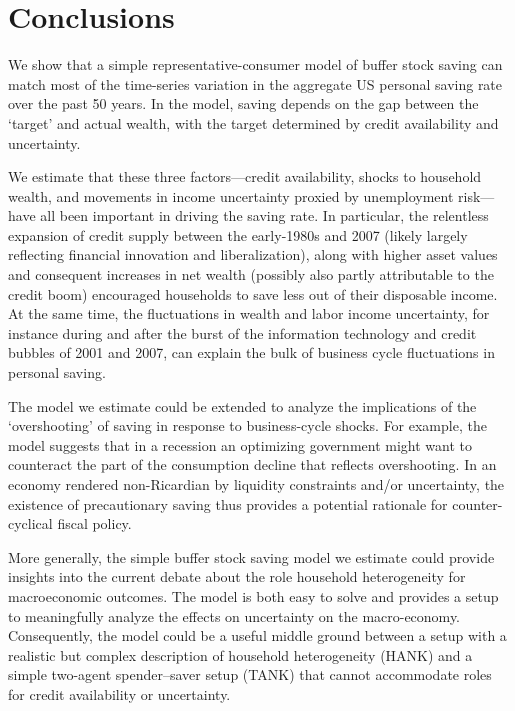 \documentclass[titlepage]{\econtex}
\begin{document}
\section{Conclusions} \label{conclusions}

We show that a simple representative-consumer model of buffer stock saving can match most of the time-series variation in the aggregate US personal saving rate over the past 50 years. In the model, saving depends on the gap between the `target' and actual wealth, with the target determined by credit availability and uncertainty.

We estimate that these three factors---credit availability, shocks to household wealth, and movements in income uncertainty proxied by unemployment risk---have all been important in driving the saving rate. In particular, the relentless expansion of credit supply between the early-1980s and 2007 (likely largely reflecting financial innovation and liberalization), along with higher asset values and consequent increases in net wealth (possibly also partly attributable to the credit boom) encouraged households to save less out of their disposable income. At the same time, the fluctuations in wealth and labor income uncertainty, for instance during and after the burst of the information technology and credit bubbles of 2001 and 2007, can explain the bulk of business cycle fluctuations in personal saving.

The model we estimate could be extended to analyze the implications of the `overshooting' of saving in response to business-cycle shocks. For example, the model suggests that in a recession an optimizing government might want to counteract the part of the consumption decline that reflects overshooting. In an economy rendered non-Ricardian by liquidity constraints and/or uncertainty, the existence of precautionary saving thus provides a potential rationale for counter-cyclical fiscal policy.

More generally, the simple buffer stock saving model we estimate could provide insights into the current debate about the role household heterogeneity for macroeconomic outcomes.  The model is both easy to solve and provides a setup to meaningfully analyze the effects on uncertainty on the macro-economy.  Consequently, the model could be a useful middle ground between a setup with a realistic but complex description of household heterogeneity (HANK) and a simple two-agent spender--saver setup (TANK) that cannot accommodate roles for credit availability or uncertainty.
\end{document}
